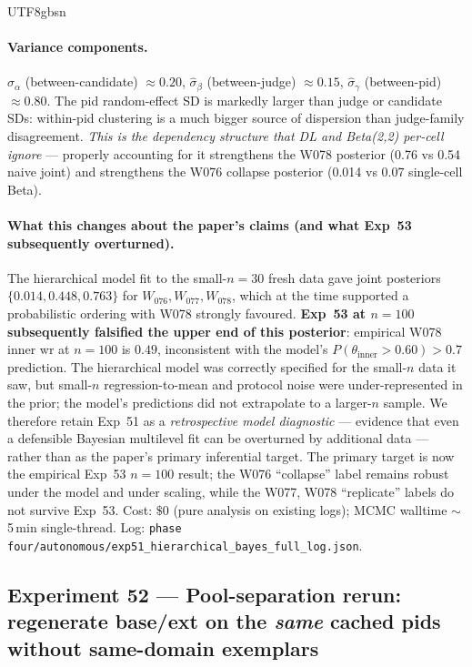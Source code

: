 \documentclass{article}
\begin{document}
\begin{CJK*}{UTF8}{gbsn}
\paragraph{Variance components.}
\(\hat\sigma_\alpha\) (between-candidate) \(\approx 0.20\),
\(\hat\sigma_\beta\) (between-judge) \(\approx 0.15\),
\(\hat\sigma_\gamma\) (between-pid) \(\approx 0.80\). The pid
random-effect SD is markedly larger than judge or candidate SDs:
within-pid clustering is a much bigger source of dispersion than
judge-family disagreement. \emph{This is the dependency structure
that DL and Beta(2,2) per-cell ignore} --- properly accounting for
it strengthens the W078 posterior (0.76 vs 0.54 naive joint) and
strengthens the W076 collapse posterior (0.014 vs 0.07 single-cell
Beta).

\paragraph{What this changes about the paper's claims (and what
Exp~53 subsequently overturned).} The hierarchical model fit to
the small-\(n=30\) fresh data gave joint posteriors
\(\{0.014, 0.448, 0.763\}\) for \(W_{076}, W_{077}, W_{078}\),
which at the time supported a probabilistic ordering with W078
strongly favoured. \textbf{Exp~53 at \(n=100\) subsequently
falsified the upper end of this posterior}: empirical W078 inner
wr at \(n=100\) is \(0.49\), inconsistent with the model's
\(P(\theta_{\text{inner}} > 0.60) > 0.7\) prediction. The
hierarchical model was correctly specified for the small-\(n\)
data it saw, but small-\(n\) regression-to-mean and protocol
noise were under-represented in the prior; the model's
predictions did not extrapolate to a larger-\(n\) sample. We
therefore retain Exp~51 as a \emph{retrospective model
diagnostic} --- evidence that even a defensible Bayesian
multilevel fit can be overturned by additional data --- rather
than as the paper's primary inferential target. The primary
target is now the empirical Exp~53 \(n=100\) result; the W076
``collapse'' label remains robust under the model and under
scaling, while the W077, W078 ``replicate'' labels do not
survive Exp~53.
Cost: \(\$0\) (pure analysis on existing logs); MCMC walltime
\({\sim}\)5\,min single-thread. Log:
\texttt{phase four/autonomous/exp51\_hierarchical\_bayes\_full\_log.json}.

\subsection{Experiment 52 --- Pool-separation rerun: regenerate
base/ext on the \emph{same} cached pids without same-domain
exemplars}
\label{sec:exp52}


\end{CJK*}
\end{document}

